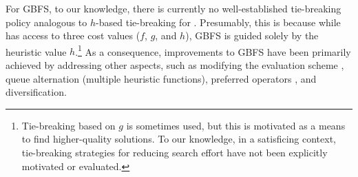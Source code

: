 For GBFS, to our knowledge, there is currently no
well-established tie-breaking policy analogous to $h$-based tie-breaking for \astar.
Presumably, this is  because
while \astar has access to three cost values ($f$, $g$, and $h$),
GBFS is guided solely by the heuristic value $h$.\footnote{Tie-breaking based on  $g$ is sometimes used, but this is motivated as a means to find higher-quality solutions. To our knowledge, in a satisficing context, tie-breaking strategies for reducing search effort have not been explicitly motivated or evaluated.} 
As a consequence,
improvements to  GBFS have been primarily achieved by addressing other aspects, such as
modifying the evaluation scheme \cite[lazy evaluation]{richter2010lama}, queue alternation
(multiple heuristic functions), preferred operators \cite{hoffmann01}, and diversification.

